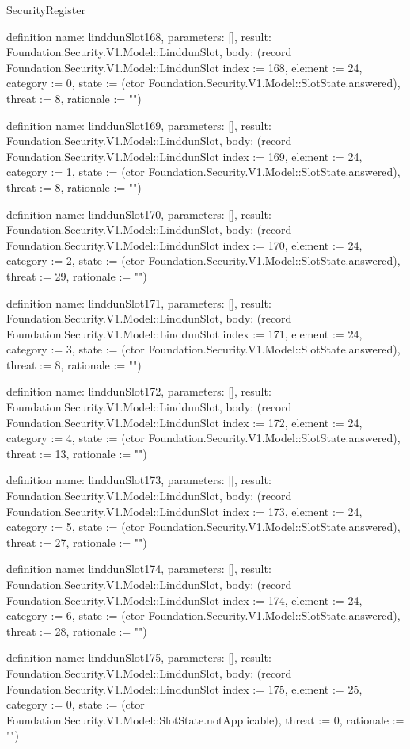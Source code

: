 \begin{lexlean}{SecurityRegister}
\begin{semanticmodule}
definition{
  name: linddunSlot168,
  parameters: [],
  result: Foundation.Security.V1.Model::LinddunSlot,
  body: (record Foundation.Security.V1.Model::LinddunSlot {index := 168, element := 24, category := 0, state := (ctor Foundation.Security.V1.Model::SlotState.answered), threat := 8, rationale := ""})
}

definition{
  name: linddunSlot169,
  parameters: [],
  result: Foundation.Security.V1.Model::LinddunSlot,
  body: (record Foundation.Security.V1.Model::LinddunSlot {index := 169, element := 24, category := 1, state := (ctor Foundation.Security.V1.Model::SlotState.answered), threat := 8, rationale := ""})
}

definition{
  name: linddunSlot170,
  parameters: [],
  result: Foundation.Security.V1.Model::LinddunSlot,
  body: (record Foundation.Security.V1.Model::LinddunSlot {index := 170, element := 24, category := 2, state := (ctor Foundation.Security.V1.Model::SlotState.answered), threat := 29, rationale := ""})
}

definition{
  name: linddunSlot171,
  parameters: [],
  result: Foundation.Security.V1.Model::LinddunSlot,
  body: (record Foundation.Security.V1.Model::LinddunSlot {index := 171, element := 24, category := 3, state := (ctor Foundation.Security.V1.Model::SlotState.answered), threat := 8, rationale := ""})
}

definition{
  name: linddunSlot172,
  parameters: [],
  result: Foundation.Security.V1.Model::LinddunSlot,
  body: (record Foundation.Security.V1.Model::LinddunSlot {index := 172, element := 24, category := 4, state := (ctor Foundation.Security.V1.Model::SlotState.answered), threat := 13, rationale := ""})
}

definition{
  name: linddunSlot173,
  parameters: [],
  result: Foundation.Security.V1.Model::LinddunSlot,
  body: (record Foundation.Security.V1.Model::LinddunSlot {index := 173, element := 24, category := 5, state := (ctor Foundation.Security.V1.Model::SlotState.answered), threat := 27, rationale := ""})
}

definition{
  name: linddunSlot174,
  parameters: [],
  result: Foundation.Security.V1.Model::LinddunSlot,
  body: (record Foundation.Security.V1.Model::LinddunSlot {index := 174, element := 24, category := 6, state := (ctor Foundation.Security.V1.Model::SlotState.answered), threat := 28, rationale := ""})
}

definition{
  name: linddunSlot175,
  parameters: [],
  result: Foundation.Security.V1.Model::LinddunSlot,
  body: (record Foundation.Security.V1.Model::LinddunSlot {index := 175, element := 25, category := 0, state := (ctor Foundation.Security.V1.Model::SlotState.notApplicable), threat := 0, rationale := ""})
}


\end{semanticmodule}
\end{lexlean}

